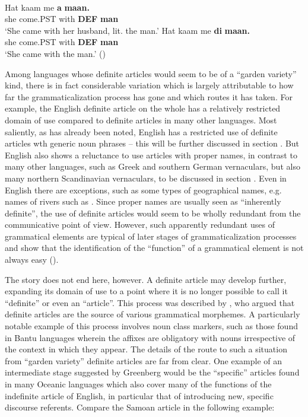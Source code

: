 \ea\label{}
\\
\ea 
	\gll 	Hat  kaam  me  \textbf{a} \textbf{maan.}\\
			she  come.PST  with  \textbf{DEF} \textbf{man}\\
	\glt 	‘She came with her husband, lit. the man.’
\ex
	\gll	Hat  kaam  me  \textbf{di} \textbf{  maan.}\\
			she  come.PST  with  \textbf{DEF} \textbf{man}\\
	\glt	‘She came with the man.’ (\citet[163]{Lyons1999})

	\z 
\z

Among languages whose definite articles would seem to be of a “garden variety” kind, there is in fact considerable variation which is largely attributable to how far the grammaticalization process has gone and which routes it has taken. For example, the English definite article on the whole has a relatively restricted domain of use compared to definite articles in many other languages. Most saliently, as has already been noted, English has a restricted use of definite articles wth generic noun phrases – this will be further discussed in section . But English also shows a reluctance to use articles with proper names, in contrast to many other languages, such as Greek and southern German vernaculars, but also many northern Scandinavian vernaculars, to be discussed in section . Even in English there are exceptions, such as some types of geographical names, e.g. names of rivers such as . Since proper names are usually seen as “inherently definite”, the use of definite articles would seem to be wholly redundant from the communicative point of view. However, such apparently redundant uses of grammatical elements are typical of later stages of grammaticalization processes and show that the identification of the “function” of a grammatical element is not always easy (\citet[81-86]{Dahl2004}).

The story does not end here, however. A definite article may develop further, expanding its domain of use to a point where it is no longer possible to call it “definite” or even an “article”. This process was described by \citet{Greenberg1978}, who argued that definite articles are the source of various grammatical morphemes.  A particularly notable example of this process involves noun class markers, such  as those found in Bantu languages wherein the affixes are obligatory with nouns irrespective of the context in which they appear. The details of the route to such a situation from “garden variety” definite articles are far from clear. One example of an intermediate stage suggested by Greenberg would be the “specific” articles found in many Oceanic languages which also cover many of the functions of the indefinite article of English, in particular that of introducing new, specific discourse referents. Compare the Samoan article  in the following example: 

